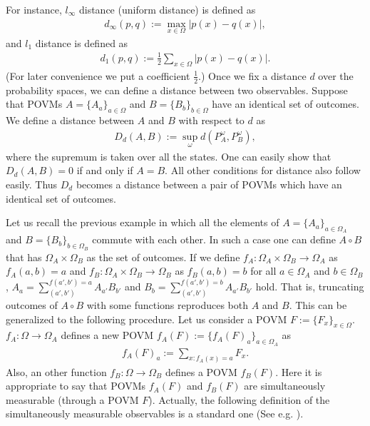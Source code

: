 \documentclass[showpacs,preprintnumbers,amsmath,amssymb]{revtex4}
\begin{document}
For instance, 
$l_{\infty}$ distance (uniform distance) is defined as
\begin{eqnarray*}
d_{\infty}(p,q):=\max_{x\in \Omega} |p(x)-q(x)|,
\end{eqnarray*}
and $l_{1}$ distance is defined as 
\begin{eqnarray*}
d_1(p,q):=\frac{1}{2}
\sum_{x \in \Omega} |p(x)-q(x)|.
\end{eqnarray*}
 (For later convenience 
we put a coefficient $\frac{1}{2}$.)
Once we fix a distance $d$ over the probability spaces, 
we can define a distance between two observables. 
Suppose that POVMs $A=\{A_a\}_{a \in \Omega}$ and $B=\{B_b\}_{b \in \Omega}$ 
have an identical set of outcomes. We define a distance between 
$A$ and $B$ with respect to $d$ as
\begin{eqnarray*}
D_d(A,B):=\sup_{\omega} d(P^{\omega}_A,P^{\omega}_B),
\end{eqnarray*}
where the supremum is taken over all the states.
One can easily show that $D_d(A,B)=0$ if and only if $A=B$. 
All other conditions for distance also follow easily.
Thus $D_d$ becomes a distance between a pair of POVMs 
which have an identical set of outcomes. 
\par
Let us recall the previous example in which 
all the elements of $A=\{A_a\}_{a \in \Omega_A}$ 
and $B=\{B_b\}_{b \in \Omega_B}$ commute with each other. 
In such a case one can define $A\circ B$ 
that has $\Omega_A \times \Omega_B$ as the set of 
outcomes.  
If we define $f_A: \Omega_A \times \Omega_B \to \Omega_A$ as 
$f_A(a,b)=a$ and $f_B: \Omega_A \times \Omega_B \to \Omega_B$ as 
$f_B(a,b)=b$ for all $a\in \Omega_A$ and 
$b \in \Omega_B$, $A_a =\sum_{(a',b')}^{f(a',b')=a}A_{a'} B_{b'}$ 
and $B_b =\sum_{(a',b')}^{f(a',b')=b}A_{a'} B_{b'}$ hold. 
That is, truncating outcomes of $A\circ B$ with some functions 
reproduces both $A$ and $B$.  
This can be generalized to the following procedure.
Let us consider a POVM $F:=\{F_x\}_{x \in \Omega}$. 
$f_A: \Omega \to \Omega_A$ defines a new POVM 
$f_A(F):=\{f_A(F)_a\}_{a \in \Omega_A}$ as 
\begin{eqnarray*}
f_A(F)_a :=\sum_{x: f_A(x)=a} F_x.
\end{eqnarray*}
Also, an other function $f_B: \Omega
\to \Omega_B$ defines a POVM $f_B(F)$. 
Here it is appropriate to say that 
POVMs $f_A(F)$ and $f_B(F)$ are simultaneously 
measurable (through a POVM $F$). 
Actually, the following definition of the simultaneously 
measurable observables is a standard one (See e.g. \cite{BHL,Araki}).
\end{document}
